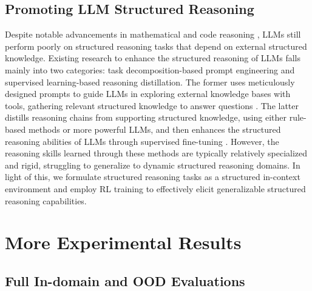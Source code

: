 \documentclass{article} %
\begin{document}
\subsection{Promoting LLM Structured Reasoning}
Despite notable advancements in mathematical and code reasoning \citep{zeng2025simplerl, chen2025r1}, LLMs still perform poorly on structured reasoning tasks that depend on external structured knowledge. 
Existing research to enhance the structured reasoning of LLMs falls mainly into two categories: task decomposition-based prompt engineering and supervised learning-based reasoning distillation. The former uses meticulously designed prompts to guide LLMs in exploring external knowledge bases with tools, gathering relevant structured knowledge to answer questions \citep{sun2023think, chen2024plan, tan2025paths}. The latter distills reasoning chains from supporting structured knowledge, using either rule-based methods or more powerful LLMs, and then enhances the structured reasoning abilities of LLMs through supervised fine-tuning \citep{luo2023reasoning, wu2025medreason, dedhia2025bottom}. 
However, the reasoning skills learned through these methods are typically relatively specialized and rigid, struggling to generalize to dynamic structured reasoning domains. 
In light of this, we formulate structured reasoning tasks as a structured in-context environment and employ RL training to effectively elicit generalizable structured reasoning capabilities. 

\section{More Experimental Results}

\subsection{Full In-domain and OOD Evaluations}
\end{document}
